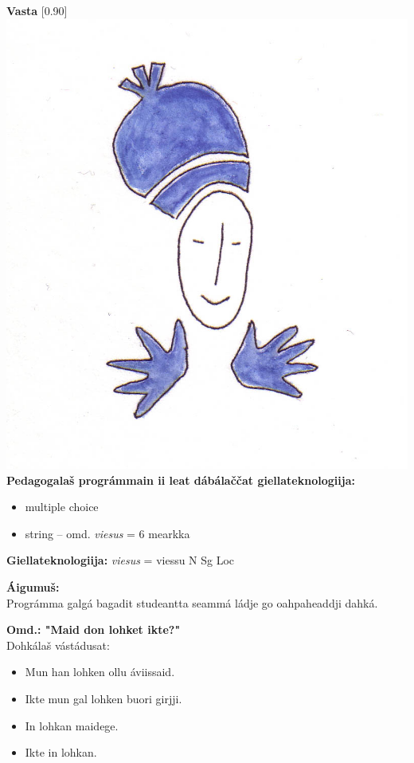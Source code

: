 \documentclass[landscape,norsk,11pt]{seminar}
\begin{document}
\begin{slide}
\newslide
\textbf{Vasta}
\scalebox{0.90}[0.90]{\includegraphics{img/vasta.png}} \\


\newslide
\textbf{Pedagogalaš prográmmain ii leat dábálaččat giellateknologiija:} 
\begin{itemize}
\item multiple choice 
\item string -- omd. \textit{viesus} = 6 mearkka 
\end{itemize}

\textbf{Giellateknologiija:} \textit{viesus} = viessu N Sg Loc 


\newslide
\textbf{Áigumuš:}\\
Prográmma galgá bagadit studeantta seammá ládje go oahpaheaddji dahká.

\newslide
\textbf{Omd.: "Maid don lohket ikte?"} \\
Dohkálaš vástádusat:
\begin{itemize}
\item Mun han lohken ollu \'aviissaid. 
\item Ikte mun gal lohken buori girjji. 
\item In lohkan maidege. 
\item Ikte in lohkan.
\end{itemize}


\end{slide}
\end{document}
